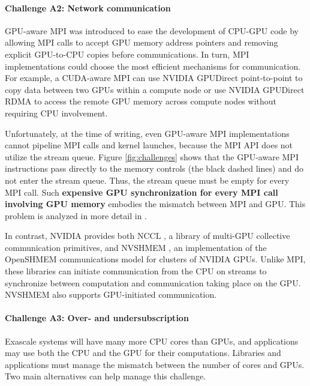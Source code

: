 \documentclass[5p,times]{elsarticle}
\begin{document}
\paragraph{Challenge A2: Network communication}



GPU-aware MPI was introduced to ease the development of CPU-GPU code by allowing MPI calls to
accept GPU memory address pointers and removing explicit GPU-to-CPU copies before communications. In turn, MPI implementations could choose the most efficient mechanisms for communication. 
For example, a CUDA-aware MPI can use NVIDIA GPUDirect point-to-point to copy
data between two GPUs within a compute node or use NVIDIA GPUDirect RDMA to
access the remote GPU memory across compute nodes without requiring CPU
involvement. 

Unfortunately, at the time of writing, even GPU-aware MPI implementations cannot pipeline MPI calls and kernel launches, because the MPI API does not utilize the stream queue. Figure \ref{fig:challenges} shows that the GPU-aware MPI instructions pass directly to the memory controls (the black dashed lines)
and do not enter the stream queue. Thus, the stream queue must be empty for every MPI call. Such {\bf expensive GPU synchronization for every  MPI call
involving GPU memory} embodies the mismatch between MPI and GPU. This problem is analyzed in more detail in \cite{SNIR}.



In contrast, NVIDIA provides both NCCL \cite{NCCL}, a library of multi-GPU collective communication primitives, and
NVSHMEM \cite{NVSHMEM}, an implementation of the OpenSHMEM \cite{OpenSHMEM} communications model for clusters
of NVIDIA GPUs. Unlike MPI, these libraries can initiate communication
from the CPU on streams to synchronize between computation and
communication taking place on the GPU. NVSHMEM also supports
GPU-initiated communication.



\paragraph{Challenge A3: Over- and undersubscription}

Exascale systems will have many more CPU cores than GPUs,
and applications may use both the CPU and the GPU for their computations.
Libraries and applications must manage the mismatch between the
number of cores and GPUs.  Two main alternatives can help
manage this challenge.
\end{document}
